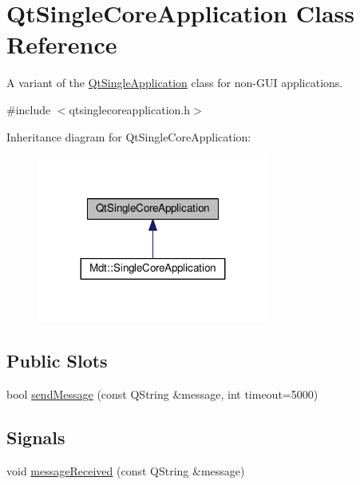 \hypertarget{class_qt_single_core_application}{}\section{Qt\+Single\+Core\+Application Class Reference}
\label{class_qt_single_core_application}


A variant of the \hyperlink{class_qt_single_application}{Qt\+Single\+Application} class for non-\/\+G\+UI applications.  




{\ttfamily \#include $<$qtsinglecoreapplication.\+h$>$}



Inheritance diagram for Qt\+Single\+Core\+Application\+:\nopagebreak
\begin{figure}[H]
\begin{center}
\leavevmode
\includegraphics[width=215pt]{class_qt_single_core_application__inherit__graph}
\end{center}
\end{figure}
\subsection*{Public Slots}
\begin{DoxyCompactItemize}
\item 
bool \hyperlink{class_qt_single_core_application_a07493d0807b216ca870adc6d40f856b0}{send\+Message} (const Q\+String \&message, int timeout=5000)
\end{DoxyCompactItemize}
\subsection*{Signals}
\begin{DoxyCompactItemize}
\item 
void \hyperlink{class_qt_single_core_application_a1af66a1770ff5eec8006a26a2ce42ca1}{message\+Received} (const Q\+String \&message)
\end{DoxyCompactItemize}

